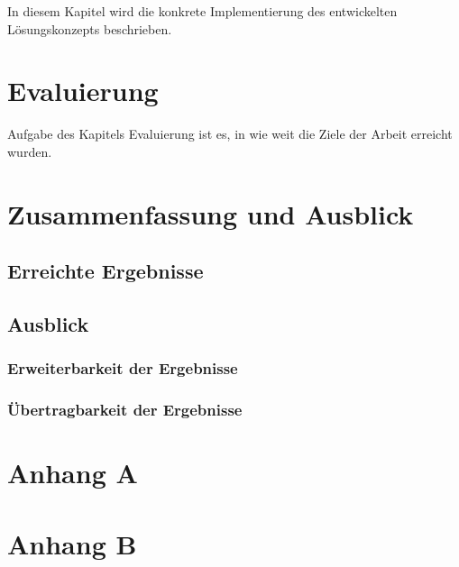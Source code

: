 \documentclass[oneside]{ausarbeitung}
\begin{document}
In diesem Kapitel wird die konkrete Implementierung des entwickelten Lösungskonzepts beschrieben.

\chapter{Evaluierung}

Aufgabe des Kapitels Evaluierung ist es, in wie weit die Ziele der Arbeit erreicht wurden.

\chapter{Zusammenfassung und Ausblick}
\label{cha:zusammenfassung}

\section{Erreichte Ergebnisse}
\label{sec:ergebnisse}

\section{Ausblick}
\label{sec:ausblick}

\subsection{Erweiterbarkeit der Ergebnisse}
\label{sub:erweiterbarkeit}

\subsection{Übertragbarkeit der Ergebnisse}
\label{sub:uebertragbarkeit}

\appendix

\printbibliography[heading=bibintoc]

\chapter{Anhang A}

\chapter{Anhang B}
\end{document}
